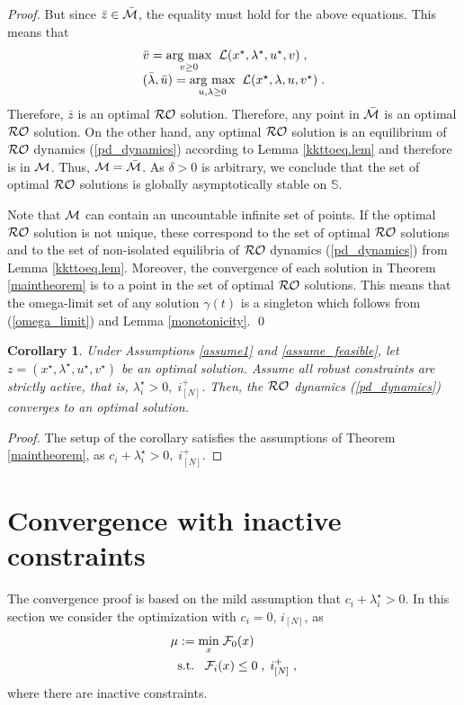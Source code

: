 \documentclass[journal,twoside,web]{ieeecolor}
\newtheorem{corollary}{Corollary}
\newcommand{\argmax}[1]{\underset{#1}{\operatorname{arg}\,\operatorname{max}}\;}
\begin{document}
\begin{proof}
But since $\bar{z}\in \bar {\cal M}$, the equality must hold for the above equations. This means that
\begin{align*}
\begin{array}{l}
\bar{v}=\argmax{v \geq 0}\; {\cal L}(x^\star,\lambda^\star,u^\star,v)\;,\\
(\bar{\lambda},\bar{u})=\argmax{u,\lambda \geq 0}\; {\cal L}(x^\star,\lambda,u,v^\star)\;.
\end{array}
\end{align*}
Therefore, ${\bar{z}}$ is an optimal ${\cal RO}$ solution. Therefore, any point in $\bar{{\cal M}}$ is an optimal ${\cal RO}$ solution. On the other hand, any optimal ${\cal RO}$ solution is an equilibrium of ${\cal RO}$ dynamics (\ref{pd_dynamics}) according to Lemma \ref{kkttoeq.lem} and therefore is in ${\cal M}$. Thus, ${\cal M}=\bar{\cal M}$. As $\delta>0$ is arbitrary, we conclude that the set of optimal ${\cal RO}$ solutions is globally asymptotically stable on $\mathbb S$.

Note that ${\cal M}$ can contain an uncountable infinite set of points. If the optimal ${\cal RO}$ solution is not unique, these correspond to the set of optimal ${\cal RO}$ solutions and to the set of non-isolated equilibria of ${\cal RO}$ dynamics (\ref{pd_dynamics}) from Lemma \ref{kkttoeq.lem}. Moreover, the convergence of each solution in Theorem \ref{maintheorem} is to a point in the set of optimal ${\cal RO}$ solutions. This means that the omega-limit set of any solution $\gamma(t)$ is a singleton which follows from (\ref{omega_limit}) and Lemma \ref{monotonicity}.
\qed
\end{proof}

\begin{corollary}
Under Assumptions \ref{assume1} and \ref{assume_feasible}, let $z=(x^\star,\lambda^\star,u^\star,v^\star)$ be an optimal solution.
Assume all robust constraints are strictly active, that is, $\lambda_i^\star>0,\;i^+_{[N]}$. Then, the ${\cal RO}$ dynamics (\ref{pd_dynamics}) converges to an optimal solution.
\end{corollary}
\begin{proof}
The setup of the corollary satisfies the assumptions of Theorem \ref{maintheorem}, as $c_i+\lambda_i^\star>0,\;i^+_{[N]}$.
\end{proof}

\section{Convergence with inactive constraints} \label{perturbed_section_pddynamics}
The convergence proof is based on the mild assumption that $c_i+\lambda_i^\star>0$.
In this section we consider the optimization with $c_i=0$, $i_{[N]}$, as
\begin{align} \label{mu_0}
&\mu:=\underset{x}{\min} \; {\cal F}_0(x)\\
&\;\;\text{s.t.}\;\;\;{\cal F}_i(x)\leq 0\;,\;i^+_{[N]}\;,\nonumber
\end{align}
where there are inactive constraints.
\end{document}
